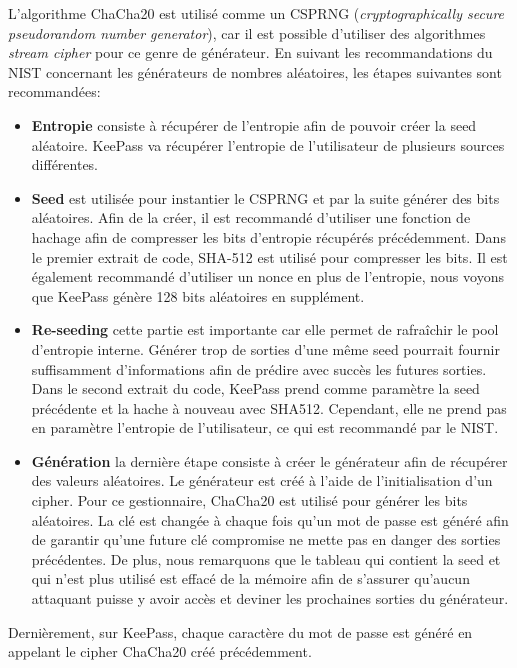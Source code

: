 L'algorithme ChaCha20 est utilisé comme un CSPRNG (\textit{cryptographically secure pseudorandom number generator}), car il est possible d'utiliser des algorithmes \textit{stream cipher} pour ce genre de générateur\cite{random}. En suivant les recommandations du NIST\cite{SP80090A} concernant les générateurs de nombres aléatoires, les étapes suivantes sont recommandées:

\begin{itemize}
	\item \textbf{Entropie} consiste à récupérer de l'entropie afin de pouvoir créer la seed aléatoire. KeePass va récupérer l'entropie de l'utilisateur de plusieurs sources différentes. 
	\item \textbf{Seed} est utilisée pour instantier le CSPRNG et par la suite générer des bits aléatoires. Afin de la créer, il est recommandé d'utiliser une fonction de hachage afin de compresser les bits d'entropie récupérés précédemment. Dans le premier extrait de code, SHA-512 est utilisé pour compresser les bits. Il est également recommandé d'utiliser un nonce en plus de l'entropie, nous voyons que KeePass génère 128 bits aléatoires en supplément. 
	\item \textbf{Re-seeding} cette partie est importante car elle permet de rafraîchir le pool d'entropie interne. Générer trop de sorties d'une même seed pourrait fournir suffisamment d'informations afin de prédire avec succès les futures sorties. Dans le second extrait du code, KeePass prend comme paramètre la seed précédente et la hache à nouveau avec SHA512. Cependant, elle ne prend pas en paramètre l'entropie de l'utilisateur, ce qui est recommandé par le NIST.  
	\item \textbf{Génération} la dernière étape consiste à créer le générateur afin de récupérer des valeurs aléatoires. Le générateur est créé à l'aide de l'initialisation d'un cipher. Pour ce gestionnaire, ChaCha20 est utilisé pour générer les bits aléatoires. La clé est changée à chaque fois qu'un mot de passe est généré afin de garantir qu'une future clé compromise ne mette pas en danger des sorties précédentes. De plus, nous remarquons que le tableau qui contient la seed et qui n'est plus utilisé est effacé de la mémoire afin de s'assurer qu'aucun attaquant puisse y avoir accès et deviner les prochaines sorties du générateur.
\end{itemize}

Dernièrement, sur KeePass, chaque caractère du mot de passe est généré en appelant le cipher ChaCha20 créé précédemment. 

